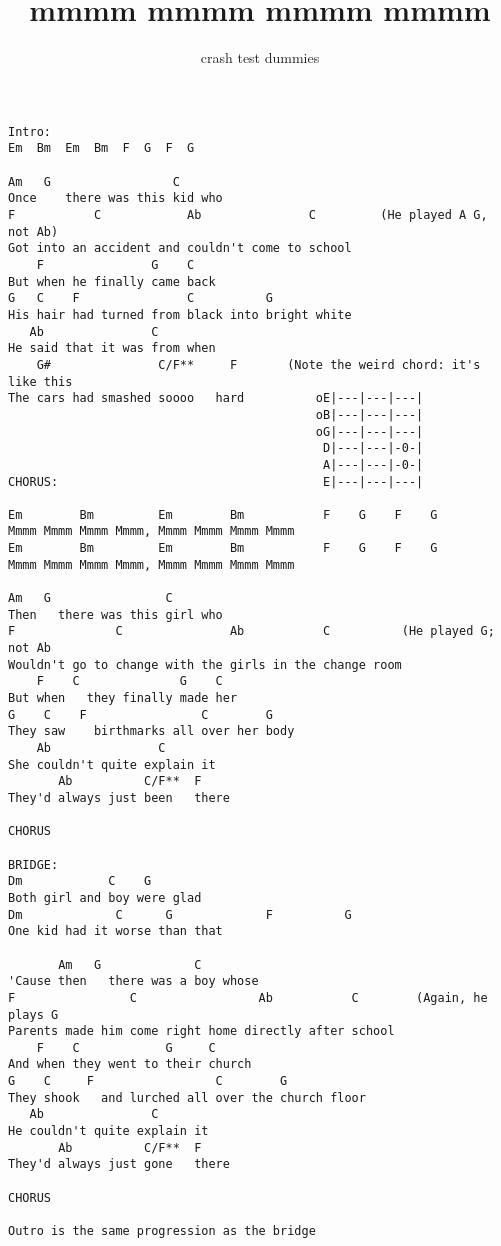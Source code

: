 \author{crash test dummies}
\title{mmmm mmmm mmmm mmmm}
\maketitle
\begin{verbatim}
Intro:
Em  Bm  Em  Bm  F  G  F  G

Am   G                 C
Once    there was this kid who
F           C            Ab               C         (He played A G, not Ab)
Got into an accident and couldn't come to school
    F               G    C
But when he finally came back
G   C    F               C          G
His hair had turned from black into bright white
   Ab               C        
He said that it was from when
    G#               C/F**     F       (Note the weird chord: it's like this
The cars had smashed soooo   hard          oE|---|---|---|
                                           oB|---|---|---|
                                           oG|---|---|---|
                                            D|---|---|-0-|
                                            A|---|---|-0-|
CHORUS:                                     E|---|---|---|

Em        Bm         Em        Bm           F    G    F    G
Mmmm Mmmm Mmmm Mmmm, Mmmm Mmmm Mmmm Mmmm
Em        Bm         Em        Bm           F    G    F    G
Mmmm Mmmm Mmmm Mmmm, Mmmm Mmmm Mmmm Mmmm

Am   G                C    
Then   there was this girl who
F              C               Ab           C          (He played G; not Ab 
Wouldn't go to change with the girls in the change room
    F    C              G    C  
But when   they finally made her
G    C    F                C        G
They saw    birthmarks all over her body
    Ab               C
She couldn't quite explain it
       Ab          C/F**  F
They'd always just been   there

CHORUS

BRIDGE:
Dm            C    G
Both girl and boy were glad
Dm             C      G             F          G
One kid had it worse than that

       Am   G             C
'Cause then   there was a boy whose
F                C                 Ab           C        (Again, he plays G
Parents made him come right home directly after school
    F    C            G     C
And when they went to their church
G    C     F                 C        G
They shook   and lurched all over the church floor
   Ab               C
He couldn't quite explain it
       Ab          C/F**  F
They'd always just gone   there

CHORUS

Outro is the same progression as the bridge
\end{verbatim}